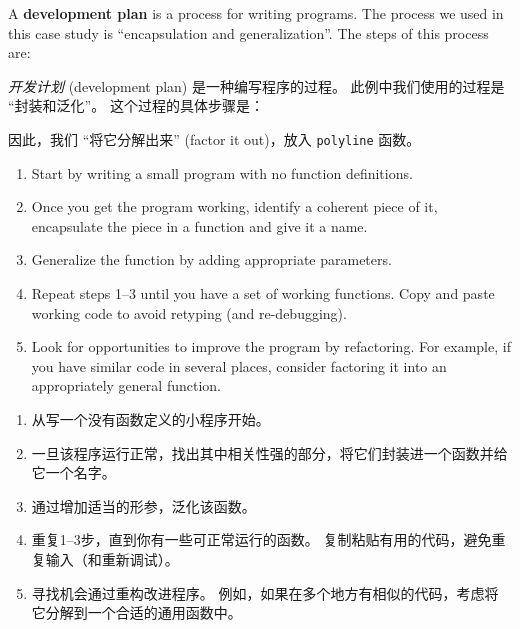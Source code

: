 A {\bf development plan} is a process for writing programs.  The
process we used in this case study is ``encapsulation and
generalization''.  The steps of this process are:

\emph{开发计划} (development plan) 是一种编写程序的过程。
此例中我们使用的过程是 ``封装和泛化''。 这个过程的具体步骤是：

因此，我们 ``将它分解出来'' (factor it out)，放入 \lstinline{polyline} 函数。

\begin{enumerate}

\item Start by writing a small program with no function definitions.

\item Once you get the program working, identify a coherent piece of
  it, encapsulate the piece in a function and give it a name.

\item Generalize the function by adding appropriate parameters.

\item Repeat steps 1--3 until you have a set of working functions.
Copy and paste working code to avoid retyping (and re-debugging).

\item Look for opportunities to improve the program by refactoring.
For example, if you have similar code in several places, consider
factoring it into an appropriately general function.

\end{enumerate}

\begin{enumerate}

\item 从写一个没有函数定义的小程序开始。

\item 一旦该程序运行正常，找出其中相关性强的部分，将它们封装进一个函数并给它一个名字。

\item 通过增加适当的形参，泛化该函数。

\item 重复1–3步，直到你有一些可正常运行的函数。
   复制粘贴有用的代码，避免重复输入（和重新调试）。

\item 寻找机会通过重构改进程序。
   例如，如果在多个地方有相似的代码，考虑将它分解到一个合适的通用函数中。

\end{enumerate}

